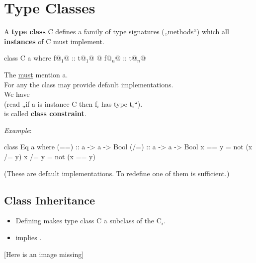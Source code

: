 

\chapter{Type Classes} %
\label{cha:type_classes}

A \textbf{type class} C defines a family of type signatures („methods“) which all \textbf{instances} of C must implement.

\begin{codebox}[haskell]
class C a where
    f@$_1$@ :: t@$_1$@
    @\dots@
    f@$_n$@ :: t@$_n$@
\end{codebox}
The  \underline{must} mention a.\\
For any  the class may provide default implementations. \\
We have  \\ (read „if a is instance C then f$_i$ has type t$_i$“).\\
 is called \textbf{class constraint}.

\textit{Example}:

\begin{codebox}[haskell]
class Eq a where
    (==) :: a -> a -> Bool
    (/=) :: a -> a -> Bool
    x == y = not (x /= y)
    x /= y = not (x == y)
\end{codebox}
(These are default implementations. To redefine one of them is sufficient.)



\section{Class Inheritance}

\begin{itemize}
    \item Defining  makes type class C a subclass of the C$_i$.\\
    \item {} implies .
\end{itemize}

\vspace{9pt}
\textcolor{myorange}{[Here is an image missing]}
\vspace{9pt}


